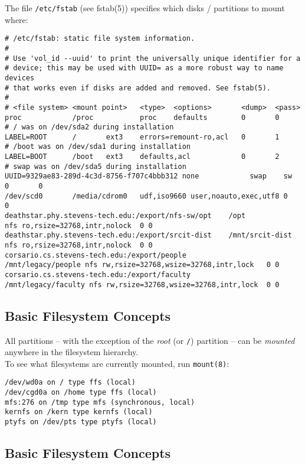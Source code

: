 \documentclass[xga]{xdvislides}
\begin{document}
The file \verb+/etc/fstab+ (see fstab(5)) specifies which disks / partitions
to mount where:
\\
\small
\begin{verbatim}
# /etc/fstab: static file system information.
#
# Use 'vol_id --uuid' to print the universally unique identifier for a
# device; this may be used with UUID= as a more robust way to name devices
# that works even if disks are added and removed. See fstab(5).
#
# <file system> <mount point>   <type>  <options>       <dump>  <pass>
proc            /proc           proc    defaults        0       0
# / was on /dev/sda2 during installation
LABEL=ROOT      /       ext3    errors=remount-ro,acl   0       1
# /boot was on /dev/sda1 during installation
LABEL=BOOT      /boot   ext3    defaults,acl            0       2
# swap was on /dev/sda5 during installation
UUID=9329ae83-289d-4c3d-8756-f707c4bbb312 none            swap    sw
0       0
/dev/scd0       /media/cdrom0   udf,iso9660 user,noauto,exec,utf8 0       0
deathstar.phy.stevens-tech.edu:/export/nfs-sw/opt    /opt            nfs ro,rsize=32768,intr,nolock  0 0
deathstar.phy.stevens-tech.edu:/export/srcit-dist    /mnt/srcit-dist  nfs ro,rsize=32768,intr,nolock  0 0
corsario.cs.stevens-tech.edu:/export/people          /mnt/legacy/people nfs rw,rsize=32768,wsize=32768,intr,lock   0 0
corsario.cs.stevens-tech.edu:/export/faculty         /mnt/legacy/faculty nfs rw,rsize=32768,wsize=32768,intr,lock  0 0

\end{verbatim}
\Normalsize


\subsection{Basic Filesystem Concepts}
All partitions -- with the exception of the {\em root} (or \verb+/+) partition
-- can be {\em mounted} anywhere in the filesystem hierarchy.
\\

To see what filesystems are currently mounted, run \verb+mount(8)+:
\\

\begin{verbatim}
/dev/wd0a on / type ffs (local)
/dev/cgd0a on /home type ffs (local)
mfs:276 on /tmp type mfs (synchronous, local)
kernfs on /kern type kernfs (local)
ptyfs on /dev/pts type ptyfs (local)
\end{verbatim}


\subsection{Basic Filesystem Concepts}
\\
\end{document}
